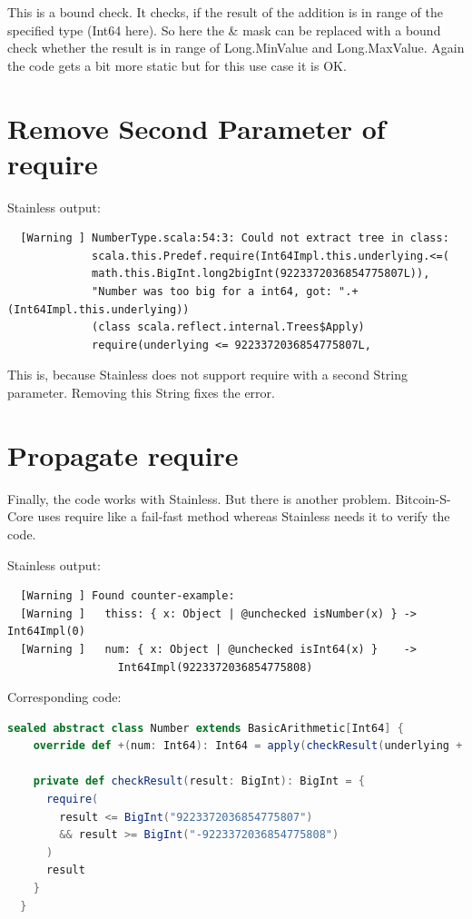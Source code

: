This is a bound check.
It checks, if the result of the addition is in range of the specified type (Int64 here).
So here the \& mask can be replaced with a bound check whether the result is in range of Long.MinValue and Long.MaxValue.
Again the code gets a bit more static but for this use case it is OK.


\section{Remove Second Parameter of require}
Stainless output:
{\footnotesize\begin{verbatim}
  [Warning ] NumberType.scala:54:3: Could not extract tree in class:
             scala.this.Predef.require(Int64Impl.this.underlying.<=(
             math.this.BigInt.long2bigInt(9223372036854775807L)),
             "Number was too big for a int64, got: ".+(Int64Impl.this.underlying))
             (class scala.reflect.internal.Trees$Apply)
             require(underlying <= 9223372036854775807L,
\end{verbatim}}

This is, because Stainless does not support require with a second String parameter.
Removing this String fixes the error.

\section{Propagate require}
Finally, the code works with Stainless.
But there is another problem.
Bitcoin-S-Core uses require like a fail-fast method whereas Stainless needs it to verify the code.

Stainless output:
{\footnotesize\begin{verbatim}
  [Warning ] Found counter-example:
  [Warning ]   thiss: { x: Object | @unchecked isNumber(x) } -> Int64Impl(0)
  [Warning ]   num: { x: Object | @unchecked isInt64(x) }    -> 
                 Int64Impl(9223372036854775808)
\end{verbatim}}

Corresponding code:
\begin{lstlisting}[language=scala]
  sealed abstract class Number extends BasicArithmetic[Int64] {
    override def +(num: Int64): Int64 = apply(checkResult(underlying + num.underlying))

    private def checkResult(result: BigInt): BigInt = {
      require(
        result <= BigInt("9223372036854775807")
        && result >= BigInt("-9223372036854775808")
      )
      result
    }
  }
\end{lstlisting}

